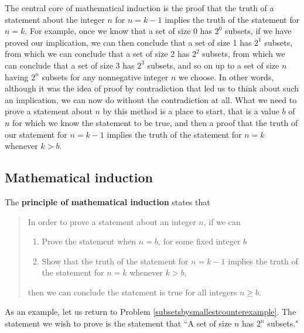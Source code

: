 The central core of mathematical induction is the proof
that the truth of a statement about the integer $n$ for $n=k-1$ implies
the truth of the statement for $n=k$.  For example, once we know that a
set of size 0 has $2^0$ subsets, if we have proved our implication, we
can then conclude that a set of size 1 has $2^1$ subsets, from which
we can conclude that a set of size 2 has $2^2$ subsets, from which we can
conclude that a set of size 3 has $2^3$ subsets, and so on up to a set of
size $n$ having $2^n$ subsets for any nonnegative integer $n$ we choose. 
In other words, although it was the idea of proof by contradiction that
led us to think about such an implication, we can now do without the
contradiction at all.  What we need to prove a statement about $n$ by
this method is a place to start, that is a value $b$ of $n$ for which we
know the statement to be true, and then a proof that  the truth of our
statement for $n=k-1$ implies the truth of the statement for $n=k$
whenever $k>b$.

\subsection{Mathematical induction}  The {\bf principle of mathematical
induction}
states that
\begin{quote}
In order to prove a statement about an integer $n$, if we
can\begin{enumerate}
\item Prove the statement when $n=b$, for some fixed integer $b$
\item Show that the truth of the statement for $n=k-1$ implies the truth
of the statement for $n=k$ whenever $k>b$,
\end{enumerate}
then we can conclude the statement is true for all integers $n\ge
b$.\end{quote} As an example, let us return to Problem
\ref{subsetsbysmallestcounterexample}.  The statement we wish to prove is
the statement that ``A set of size $n$ has $2^n$ subsets."  

